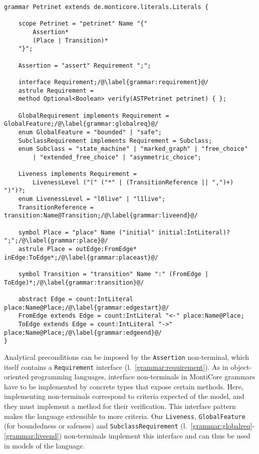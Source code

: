 \begin{lstfloat}
	\centering
\begin{lstlisting}[style=mcgrammar]
grammar Petrinet extends de.monticore.literals.Literals {
	
	scope Petrinet = "petrinet" Name "{"
		Assertion*
		(Place | Transition)*
	"}";
	
	Assertion = "assert" Requirement ";";
	
	interface Requirement;/@\label{grammar:requirement}@/
	astrule Requirement =
	method Optional<Boolean> verify(ASTPetrinet petrinet) { };
	
	GlobalRequirement implements Requirement = GlobalFeature;/@\label{grammar:globalreq}@/
	enum GlobalFeature = "bounded" | "safe";
	SubclassRequirement implements Requirement = Subclass;
	enum Subclass = "state_machine" | "marked_graph" | "free_choice"
		| "extended_free_choice" | "asymmetric_choice";
	
	Liveness implements Requirement =
		LivenessLevel ("(" ("*" | (TransitionReference || ",")+) ")")?;
	enum LivenessLevel = "l0live" | "l1live";
	TransitionReference = transition:Name@Transition;/@\label{grammar:liveend}@/
	
	symbol Place = "place" Name ("initial" initial:IntLiteral)? ";";/@\label{grammar:place}@/
	astrule Place = outEdge:FromEdge* inEdge:ToEdge*;/@\label{grammar:placeast}@/
	
	symbol Transition = "transition" Name ":" (FromEdge | ToEdge)*;/@\label{grammar:transition}@/
	
	abstract Edge = count:IntLiteral place:Name@Place;/@\label{grammar:edgestart}@/
	FromEdge extends Edge = count:IntLiteral "<-" place:Name@Place;
	ToEdge extends Edge = count:IntLiteral "->" place:Name@Place;/@\label{grammar:edgeend}@/
}
\end{lstlisting}
	\caption{The \emph{petrinets4analysis} MontiCore grammar}\label{lst:language:grammar}
\end{lstfloat}

Analytical preconditions can be imposed by the \texttt{Assertion} non-terminal, which itself contains a \texttt{Requirement} interface (l.~\ref{grammar:requirement}). As in object-oriented programming languages, interface non-terminals in MontiCore grammars have to be implemented by concrete types that expose certain methods. Here, implementing non-terminals correspond to criteria expected of the model, and they must implement a method for their verification. This interface pattern makes the language extensible to more criteria. Our \texttt{Liveness}, \texttt{GlobalFeature} (for boundedness or safeness) and \texttt{SubclassRequirement} (l.~\ref{grammar:globalreq}-\ref{grammar:liveend}) non-terminals implement this interface and can thus be used in models of the language.

